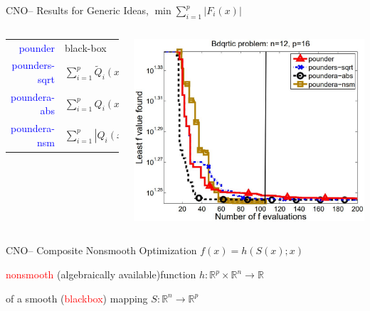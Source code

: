 \documentclass[handout,aspectratio=54]{beamer}
\numberwithin{theorem}{section}
\begin{document}
\begin{frame}{CNO– Results for Generic Ideas, $\min\sum_{i=1}^p|F_i(x)|$}
\begin{columns}
\scriptsize
\begin{tabular}{rl}
\textcolor{blue}{pounder} & black-box\\
\textcolor{blue}{pounders-sqrt} & $\sum_{i=1}^p\tilde{Q}_i(x)^2$\\
\textcolor{blue}{poundera-abs} & $\sum_{i=1}^pQ_i(x)$\\
\textcolor{blue}{poundera-nsm} & $\sum_{i=1}^p|Q_i(x)|$
\end{tabular}

\includegraphics[width=\textwidth]{fig/50-2.jpg}
\end{columns}
\end{frame}

\begin{frame}{CNO– Composite Nonsmooth Optimization $f(x)=h(S(x);x)$}
\small
\begin{center}
\textcolor{red}{nonsmooth} (\textcolor[RGB]{0,130,80}{algebraically available})function $h:\mathbb{R}^p\times\mathbb{R}^n\rightarrow\mathbb{R}$

of a \textcolor[RGB]{0,130,80}{smooth} (\textcolor{red}{blackbox}) mapping $S:\mathbb{R}^n\rightarrow\mathbb{R}^p$
\end{center}

\vspace{6cm}
\end{frame}
\end{document}

